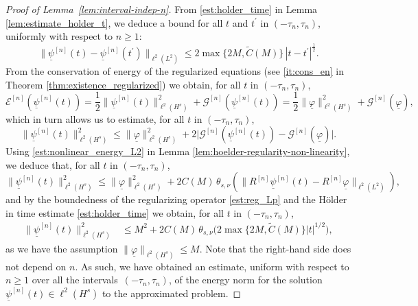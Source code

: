 \documentclass[10pt,a4paper]{amsart}
\newcommand{\thetasnu}{\theta_{s,\nu}}
\newcommand{\ulphi}{\underline{\varphi}}
\newcommand{\ulpsi}{\underline{\psi}}
\begin{document}
\begin{proof}[Proof of Lemma~\ref{lem:interval-indep-n}]
		From \eqref{est:holder_time} in Lemma \ref{lem:estimate_holder_t}, we deduce a bound for all $t$ and $t^\prime$ in $(-\tau_n, \tau_n)$, uniformly with respect to $ n \geq 1$: 
		\begin{equation}\label{est:L2_holder_continuity}
			\| \ulpsi^{[n]}(t)-\ulpsi^{[n]}(t^\prime) \|_{\ell^2(L^2)} \leq 2 \max\{2M, \tilde{C}(M)\}\, | t-t^\prime |^{\frac12} .
		\end{equation}
		From the conservation of energy of the regularized equations (see \ref{it:cons_en} in Theorem \ref{thm:existence_regularized}) we obtain, for all $t$ in $(-\tau_n, \tau_n) $,
		\begin{equation*}
			\mathcal{E}^{[n]}(\ulpsi^{[n]}(t)) = \frac{1}{2} \| \ulpsi^{[n]}(t) \|_{\ell^2(H^{s})}^2 +  \mathscr{G}^{[n]}(\ulpsi^{[n]}(t)) = \frac{1}{2} \| \ulphi  \|_{\ell^2(H^{s})}^2 + \mathscr{G}^{[n]}(\ulphi ),
		\end{equation*}
		which in turn allows us to estimate, for all $t$ in $(-\tau_n, \tau_n) $,
		\begin{equation*}
			\| \ulpsi^{[n]}(t) \|_{\ell^2(H^{s})}^2 \leq \| \ulphi  \|_{\ell^2(H^{s})}^2 +2  \big| \mathscr{G}^{[n]}(\ulpsi^{[n]}(t)) - \mathscr{G}^{[n]}(\ulphi ) \big| .
		\end{equation*}
		Using \eqref{est:nonlinear_energy_L2} in Lemma \ref{lem:hoelder-regularity-non-linearity}, we deduce that, for all $t$ in $(-\tau_n, \tau_n) $,
		\begin{equation*}
			\| \ulpsi^{[n]}(t) \|_{\ell^2(H^{s})}^2 \leq \| \ulphi \|_{\ell^2(H^{s})}^2 +2  C(M) \, \thetasnu (\| R^{[n]}\ulpsi^{[n]}(t)-R^{[n]}\ulphi \|_{\ell^2(L^2)})  ,
		\end{equation*}
		and by the boundedness of the regularizing operator \eqref{est:reg_Lp} and the H{\"o}lder in time estimate \eqref{est:holder_time} we obtain, for all $t$ in $(-\tau_n, \tau_n) $,
		\begin{align*}
			\| \ulpsi^{[n]}(t) \|_{\ell^2(H^{s})}^2 
			&\leq M^2 + 2  C(M) \, \thetasnu \big( 2 \max\{2M,\tilde{C}(M)\}  |t|^{1/2} \big) ,
		\end{align*}
		as we have the assumption $ \| \ulphi \|_{\ell^2(H^{s})} \leq M $.  Note that the right-hand side does not depend on $n$. As such, we have obtained an estimate,  uniform with respect to $ n \geq 1$ over all the intervals~$ (-\tau_n, \tau_n) $, of the energy norm for the solution $\ulpsi^{[n]}(t) \in \ell^2(H^{s}) $ to the approximated problem.
		

\end{proof}
\end{document}
